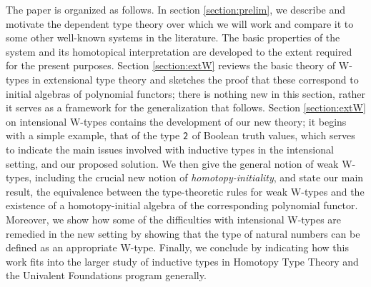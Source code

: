 The paper is organized as follows.  In section \ref{section:prelim}, we describe and motivate the dependent type theory over which we will work and compare it to some other well-known systems in the literature. The basic properties of the system and its homotopical interpretation are developed to the extent required for the present purposes. Section \ref{section:extW} reviews the basic theory of W-types in extensional type theory and sketches the proof that these correspond to initial algebras of polynomial functors; there is nothing new in this section, rather it serves as a framework for the generalization that follows.  Section \ref{section:extW} on intensional W-types contains the development of our new theory; it begins with a simple example, that of the type $\mathsf{2}$ of Boolean truth values, which serves to indicate the main issues involved with inductive types in the intensional setting, and our proposed solution.  We then give the general notion of weak W-types, including the crucial new notion of \emph{homotopy-initiality}, and state our main result, the equivalence between the type-theoretic rules for weak W-types and the existence of a homotopy-initial algebra of the corresponding polynomial functor.  
Moreover, we show how some of the difficulties with intensional W-types are remedied in the new setting by showing that the type of natural numbers can be defined as an appropriate W-type.
Finally, we conclude by indicating how this work fits into the larger study of inductive types in Homotopy Type Theory and the Univalent Foundations program generally.